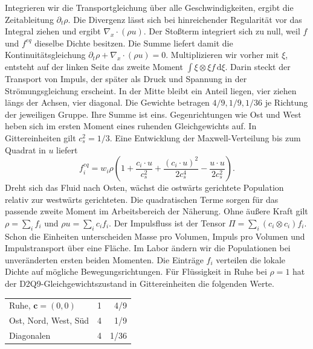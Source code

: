 Integrieren wir die Transportgleichung über alle Geschwindigkeiten, ergibt die Zeitableitung \(\partial_t\rho\). Die Divergenz lässt sich bei hinreichender Regularität vor das Integral ziehen und ergibt \(\nabla_x\cdot(\rho u)\). Der Stoßterm integriert sich zu null, weil \(f\) und \(f^{eq}\) dieselbe Dichte besitzen. Die Summe liefert damit die Kontinuitätsgleichung \(\partial_t\rho+\nabla_x\cdot(\rho u)=0\). Multiplizieren wir vorher mit \(\xi\), entsteht auf der linken Seite das zweite Moment \(\int\xi\otimes\xi f\,\mathrm d\xi\). Darin steckt der Transport von Impuls, der später als Druck und Spannung in der Strömungsgleichung erscheint.
\hypertarget{punkt8-2-1}{}
In der Mitte bleibt ein Anteil liegen, vier ziehen längs der Achsen, vier diagonal. Die Gewichte betragen \(4/9,1/9,1/36\) je Richtung der jeweiligen Gruppe. Ihre Summe ist eins. Gegenrichtungen wie Ost und West heben sich im ersten Moment eines ruhenden Gleichgewichts auf. In Gittereinheiten gilt \(c_s^2=1/3\).
\hypertarget{punkt8-2-2}{}
Eine Entwicklung der Maxwell-Verteilung bis zum Quadrat in \(u\) liefert
\[
 f_i^{eq}=w_i\rho\left(1+\frac{c_i\cdot u}{c_s^2}
 +\frac{(c_i\cdot u)^2}{2c_s^4}-\frac{u\cdot u}{2c_s^2}\right).
\]
Dreht sich das Fluid nach Osten, wächst die ostwärts gerichtete Population relativ zur westwärts gerichteten. Die quadratischen Terme sorgen für das passende zweite Moment im Arbeitsbereich der Näherung.
\hypertarget{punkt8-2-3}{}
Ohne äußere Kraft gilt \(\rho=\sum_i f_i\) und \(\rho u=\sum_i c_i f_i\). Der Impulsfluss ist der Tensor \(\Pi=\sum_i(c_i\otimes c_i)f_i\). Schon die Einheiten unterscheiden Masse pro Volumen, Impuls pro Volumen und Impulstransport über eine Fläche. Im Labor ändern wir die Populationen bei unveränderten ersten beiden Momenten.
Die Einträge \(f_i\) verteilen die lokale Dichte auf mögliche Bewegungsrichtungen. Für Flüssigkeit in Ruhe bei \(\rho=1\) hat der D2Q9-Gleichgewichtszustand in Gittereinheiten die folgenden Werte.
{\tblstart\begin{tabularx}{\linewidth}{@{}Yrr@{}}\toprule
{}&&\\\midrule
Ruhe, \(\mathbf c=(0,0)\)&1&4/9\\
Ost, Nord, West, Süd&4&1/9\\
Diagonalen&4&1/36\\\bottomrule
\end{tabularx}\par}

